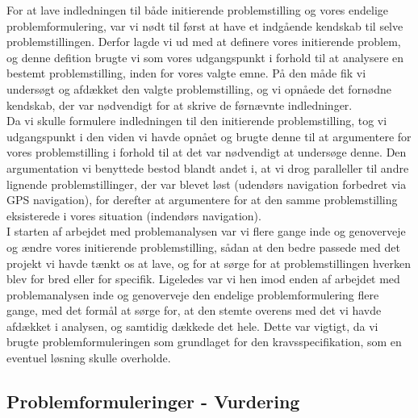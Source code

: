 \documentclass[a4paper,12pt,oneside,article]{memoir}
\begin{document}
        For at lave indledningen til både initierende problemstilling og vores endelige problemformulering, var vi nødt til først at have et indgående kendskab til selve problemstillingen. Derfor lagde vi ud med at definere vores initierende problem, og denne defition brugte vi som vores udgangspunkt i forhold til at analysere en bestemt problemstilling, inden for vores valgte emne. På den måde fik vi undersøgt og afdækket den valgte problemstilling, og vi opnåede det fornødne kendskab, der var nødvendigt for at skrive de førnævnte indledninger.\\
        Da vi skulle formulere indledningen til den initierende problemstilling, tog vi udgangspunkt i den viden vi havde opnået og brugte denne til at argumentere for vores problemstilling i forhold til at det var nødvendigt at undersøge denne. Den argumentation vi benyttede bestod blandt andet i, at vi drog paralleller til andre lignende problemstillinger, der var blevet løst (udendørs navigation forbedret via GPS navigation), for derefter at argumentere for at den samme problemstilling eksisterede i vores situation (indendørs navigation).\\
        I starten af arbejdet med problemanalysen var vi flere gange inde og genoverveje og ændre vores initierende problemstilling, sådan at den bedre passede med det projekt vi havde tænkt os at lave, og for at sørge for at problemstillingen hverken blev for bred eller for specifik.
        Ligeledes var vi hen imod enden af arbejdet med problemanalysen inde og genoverveje den endelige problemformulering flere gange, med det formål at sørge for, at den stemte overens med det vi havde afdækket i analysen, og samtidig dækkede det hele. Dette var vigtigt, da vi brugte problemformuleringen som grundlaget for den kravsspecifikation, som en eventuel løsning skulle overholde.

        \subsection{Problemformuleringer - Vurdering}
\end{document}
